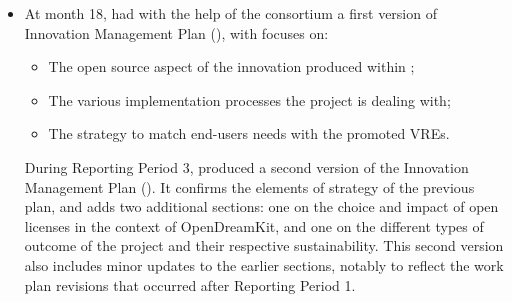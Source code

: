 \begin{itemize}
\item At month 18,  had with the help of the consortium a
  first version of Innovation Management Plan
  (), with focuses on:
  \begin{itemize}
  \item{The open source aspect of the innovation produced within \ODK;}
  \item{The various implementation processes the project is dealing with;}
  \item{The strategy to match end-users needs with the promoted VREs}.
  \end{itemize}

  \noindent
  During Reporting Period 3,  produced a second version of
  the Innovation Management Plan ().
  It confirms the elements of strategy of the previous plan, and adds
  two additional sections: one on the choice and impact of open
  licenses in the context of OpenDreamKit, and one on the different
  types of outcome of the project and their respective sustainability.
  This second version also includes minor updates to the earlier
  sections, notably to reflect the work plan revisions that occurred
  after Reporting Period 1.
\end{itemize}


